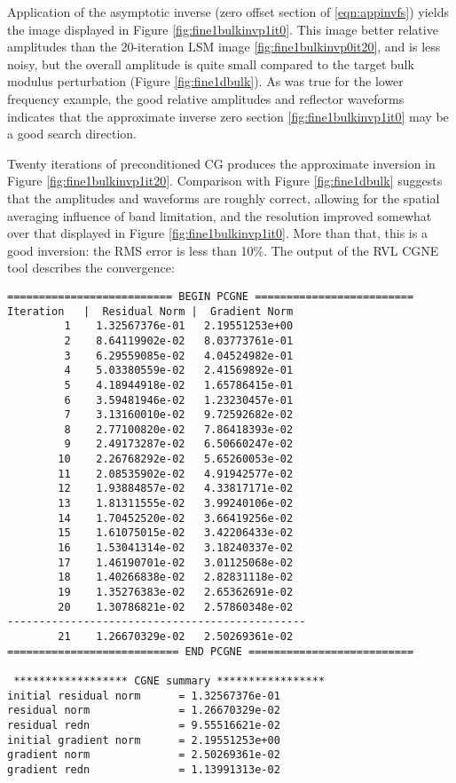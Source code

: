 Application of the asymptotic inverse (zero offset section of
\ref{eqn:appinvfs}) yields the image displayed in Figure
\ref{fig:fine1bulkinvp1it0}. This image better relative amplitudes than the 20-iteration LSM image
\ref{fig:fine1bulkinvp0it20}, and is less noisy, but the overall
amplitude is quite small compared to the target bulk modulus
perturbation (Figure \ref{fig:fine1dbulk}). As was true for the lower
frequency example, the good relative amplitudes and reflector
waveforms  indicates that the approximate inverse
zero section \ref{fig:fine1bulkinvp1it0} may be a good search
direction. 


Twenty iterations of preconditioned
CG produces the approximate inversion in Figure
\ref{fig:fine1bulkinvp1it20}. Comparison with Figure
\ref{fig:fine1dbulk} suggests that the amplitudes and waveforms are
roughly correct,
allowing for the spatial averaging influence of band limitation, and the
resolution improved somewhat over that displayed in Figure
\ref{fig:fine1bulkinvp1it0}. More than that, this is a good
inversion: the RMS error is less than 10\%. The output of the RVL CGNE
tool describes the convergence:

\begin{verbatim}
========================== BEGIN PCGNE =========================
Iteration   |  Residual Norm |  Gradient Norm
         1    1.32567376e-01   2.19551253e+00
         2    8.64119902e-02   8.03773761e-01
         3    6.29559085e-02   4.04524982e-01
         4    5.03380559e-02   2.41569892e-01
         5    4.18944918e-02   1.65786415e-01
         6    3.59481946e-02   1.23230457e-01
         7    3.13160010e-02   9.72592682e-02
         8    2.77100820e-02   7.86418393e-02
         9    2.49173287e-02   6.50660247e-02
        10    2.26768292e-02   5.65260053e-02
        11    2.08535902e-02   4.91942577e-02
        12    1.93884857e-02   4.33817171e-02
        13    1.81311555e-02   3.99240106e-02
        14    1.70452520e-02   3.66419256e-02
        15    1.61075015e-02   3.42206433e-02
        16    1.53041314e-02   3.18240337e-02
        17    1.46190701e-02   3.01125068e-02
        18    1.40266838e-02   2.82831118e-02
        19    1.35276383e-02   2.65362691e-02
        20    1.30786821e-02   2.57860348e-02
-----------------------------------------------
        21    1.26670329e-02   2.50269361e-02
=========================== END PCGNE ==========================

 ****************** CGNE summary *****************  
initial residual norm      = 1.32567376e-01
residual norm              = 1.26670329e-02
residual redn              = 9.55516621e-02
initial gradient norm      = 2.19551253e+00
gradient norm              = 2.50269361e-02
gradient redn              = 1.13991313e-02


\end{verbatim}

